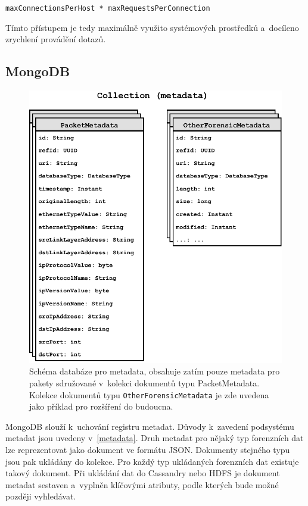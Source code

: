 \vspace{0.5cm}
\texttt{maxConnectionsPerHost * maxRequestsPerConnection}

\vspace{0.5cm}
\noindent Tímto přístupem je tedy maximálně využito systémových prostředků a~docíleno zrychlení provádění dotazů.

\subsection{MongoDB} \label{mongoDB}

\begin{figure}[!h]
  \centering
  \includegraphics[width=13cm]{template-fig/MetadataSchema.pdf}
  \caption{Schéma databáze pro metadata, obsahuje zatím pouze metadata pro pakety sdružované v~kolekci dokumentů typu PacketMetadata. Kolekce dokumentů typu \texttt{OtherForensicMetadata} je zde uvedena jako příklad pro rozšíření do budoucna.}
  \label{FIG_MetadataSchema}
\end{figure}

MongoDB slouží k~uchování registru metadat. Důvody k~zavedení podsystému metadat jsou uvedeny v~\ref{metadata}. Druh metadat pro nějaký typ forenzních dat lze reprezentovat jako dokument ve formátu JSON. Dokumenty stejného typu jsou pak ukládány do kolekce. Pro každý typ ukládaných forenzních dat existuje takový dokument. Při ukládání dat do Cassandry nebo HDFS je dokument metadat sestaven a~vyplněn klíčovými atributy, podle kterých bude možné později vyhledávat.

